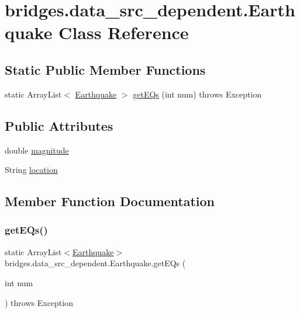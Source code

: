 \hypertarget{classbridges_1_1data__src__dependent_1_1_earthquake}{}\section{bridges.\+data\+\_\+src\+\_\+dependent.\+Earthquake Class Reference}
\label{classbridges_1_1data__src__dependent_1_1_earthquake}
\subsection*{Static Public Member Functions}
\begin{DoxyCompactItemize}
\item 
static Array\+List$<$ \hyperlink{classbridges_1_1data__src__dependent_1_1_earthquake}{Earthquake} $>$ \hyperlink{classbridges_1_1data__src__dependent_1_1_earthquake_af36a454e176833a8a62448374d8a3c56}{get\+E\+Qs} (int num)  throws Exception    
\end{DoxyCompactItemize}
\subsection*{Public Attributes}
\begin{DoxyCompactItemize}
\item 
double \hyperlink{classbridges_1_1data__src__dependent_1_1_earthquake_a11ef9e78dedf05d44fc72fcf2b097d83}{magnitude}
\item 
String \hyperlink{classbridges_1_1data__src__dependent_1_1_earthquake_a5bcddcb4e356ff31ce13e45500833af2}{location}
\end{DoxyCompactItemize}


\subsection{Member Function Documentation}
\hypertarget{classbridges_1_1data__src__dependent_1_1_earthquake_af36a454e176833a8a62448374d8a3c56}{}\label{classbridges_1_1data__src__dependent_1_1_earthquake_af36a454e176833a8a62448374d8a3c56} 
\subsubsection{\texorpdfstring{get\+E\+Qs()}{getEQs()}}
{\footnotesize\ttfamily static Array\+List$<$\hyperlink{classbridges_1_1data__src__dependent_1_1_earthquake}{Earthquake}$>$ bridges.\+data\+\_\+src\+\_\+dependent.\+Earthquake.\+get\+E\+Qs (\begin{DoxyParamCaption}\item[{int}]{num }\end{DoxyParamCaption}) throws Exception\hspace{0.3cm}{\ttfamily [static]}}



